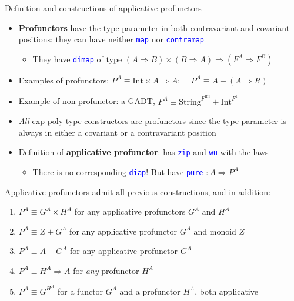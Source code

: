 \documentclass[english]{beamer}
\begin{document}
\begin{frame}{Definition and constructions of applicative profunctors}
\begin{itemize}
\item \vspace{-0.2cm}\textbf{Profunctors} have the type parameter in both
contravariant and covariant positions; they can have neither \texttt{\textcolor{blue}{\footnotesize{}map}}
nor \texttt{\textcolor{blue}{\footnotesize{}contramap}} 
\begin{itemize}
\item They have \texttt{\textcolor{blue}{\footnotesize{}dimap}} of type
{\footnotesize{}$\left(A\Rightarrow B\right)\times\left(B\Rightarrow A\right)\Rightarrow(F^{A}\Rightarrow F^{B})$ }{\footnotesize \par}
\end{itemize}
\item Examples of profunctors: {\footnotesize{}$P^{A}\equiv\text{Int}\times A\Rightarrow A$;
$\quad P^{A}\equiv A+\left(A\Rightarrow R\right)$}{\footnotesize \par}
\item Example of non-profunctor: a GADT, {\footnotesize{}$F^{A}\equiv\text{String}^{F^{\text{Int}}}+\text{Int}^{F^{1}}$}{\footnotesize \par}
\item \emph{All} exp-poly type constructors are profunctors since the type
parameter is always in either a covariant or a contravariant position
\item Definition of \textbf{applicative profunctor}: has \texttt{\textcolor{blue}{\footnotesize{}zip}}
and \texttt{\textcolor{blue}{\footnotesize{}wu}} with the laws
\begin{itemize}
\item There is no corresponding \texttt{\textcolor{blue}{\footnotesize{}diap}}!
But have \texttt{\textcolor{blue}{\footnotesize{}pure}} {\footnotesize{}$:A\Rightarrow P^{A}$} 
\end{itemize}
\end{itemize}
Applicative profunctors admit all previous constructions, and in addition:
\begin{enumerate}
\item $P^{A}\equiv G^{A}\times H^{A}$ for any applicative profunctors $G^{A}$
and $H^{A}$
\item $P^{A}\equiv Z+G^{A}$ for any applicative profunctor $G^{A}$ and
monoid $Z$
\item $P^{A}\equiv A+G^{A}$ for any applicative profunctor $G^{A}$
\item $P^{A}\equiv H^{A}\Rightarrow A$ for \emph{any} profunctor $H^{A}$
\item $P^{A}\equiv G^{H^{A}}$ for a functor $G^{A}$ and a profunctor $H^{A}$,
both applicative
\end{enumerate}
\end{frame}
\end{document}
